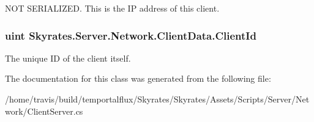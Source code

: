 N\-O\-T S\-E\-R\-I\-A\-L\-I\-Z\-E\-D. This is the I\-P address of this client. 

\hypertarget{class_skyrates_1_1_server_1_1_network_1_1_client_data_aac65d3f831d9663be5dc72fe934ac8ea}{
\subsubsection[{Client\-Id}]{\setlength{\rightskip}{0pt plus 5cm}uint Skyrates.\-Server.\-Network.\-Client\-Data.\-Client\-Id}}\label{class_skyrates_1_1_server_1_1_network_1_1_client_data_aac65d3f831d9663be5dc72fe934ac8ea}


The unique I\-D of the client itself. 



The documentation for this class was generated from the following file\-:\begin{DoxyCompactItemize}
\item 
/home/travis/build/temportalflux/\-Skyrates/\-Skyrates/\-Assets/\-Scripts/\-Server/\-Network/Client\-Server.\-cs\end{DoxyCompactItemize}
